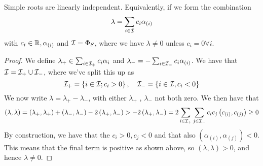 \begin{claim}
Simple roots are linearly independent. Equivalently, 
if we form the combination 
\[
	\lambda = \sum_{ i \in \mathcal{I}   } c _ i \alpha _{ (i )     }  
\]  with $ c _ i \in \mathbb{R} , \alpha _{ \left(  i  \right)  } $ and 
$ \mathcal{I}  = \Phi  _ S  $, where we have 
$ \lambda \neq 0  $ unless $ c _ i = 0 \forall i $. 
\begin{proof}
	We define $ \lambda _ + \in \sum_{ i \in \mathcal{I}_ + } c _ i 
	\alpha_ i $ and $ \lambda _ - =  - \sum_{ i \in \mathcal{I} _ - }
	c_ i \alpha _{ \left(  i  \right)   } $. 
	We have that $ \mathcal{I} = \mathcal{I} _ + \cup \mathcal{I} _ - $, 
	where we've split this up as 
	 \[
	 \mathcal{I} _ +  = \left\{  i \in \mathcal{I} ; c _ i > 0  \right\} , 
	 \quad \mathcal{I} _ - = \left\{  i \in \mathcal{I} , c _ i < 0  \right\} 
	\] We now write $ \lambda = \lambda _ + - \lambda _ - $, 
	with either $ \lambda _ + $ , $ \lambda _ - $ not 
	both zero. We then have that 
	\[
	 \left(  \lambda , \lambda  \right)   = 
	 \left(  \lambda _ + , \lambda _ +  \right)  + 
	 \left(  \lambda _ - , \lambda _ -  \right)   -  2 
	 \left(  \lambda _ + , \lambda _ -  \right)  >  - 2 \left(  
	 \lambda _ + , \lambda _ - \right)  = 
	   2 \sum_{ i \in \mathcal{I} _ + } \sum_{ j \in \mathcal{I}_{ - } } c_ i c _ j 
	   \left(  c _{ ( i ) } , c _{ ( j  )   }  \right) \geq 0 
	\] By construction, we have that the 
	$ c _ i  > 0 , c _ j < 0 $ and that also 
	$ \left(  \alpha _{ ( i  )   }, \alpha _{ ( j )  } \right) < 0  $. 
	This means that the final term is positive as shown above, 
	so $ \left(  \lambda , \lambda  \right)   > 0 $, and hence
	$ \lambda \neq 0 $. 
\end{proof}
\end{claim}

